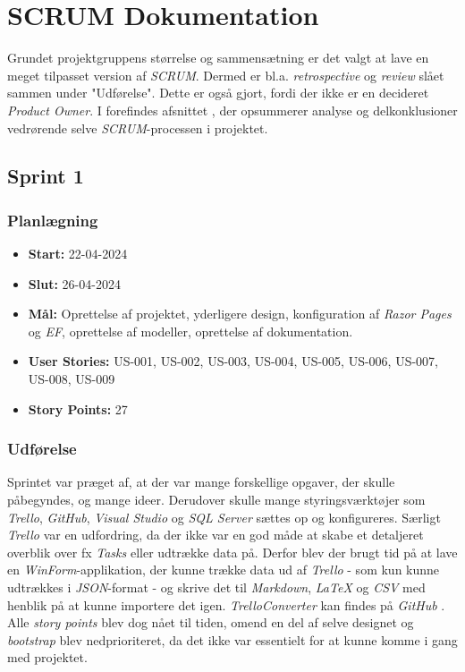 \chapter{SCRUM Dokumentation}
\label{chapter:scrum-documentation}
Grundet projektgruppens størrelse og sammensætning er det valgt at lave en meget tilpasset version af \emph{SCRUM}. Dermed er bl.a. \emph{retrospective} og \emph{review} slået sammen under "Udførelse". 
Dette er også gjort, fordi der ikke er en decideret \emph{Product Owner}. 
I  forefindes afsnittet , der opsummerer analyse og delkonklusioner vedrørende selve \emph{SCRUM}-processen i projektet.

\section{Sprint 1}
\label{sec:sprint-1}
\subsection{Planlægning}
\label{subsec:sprint-1-plan}
\begin{itemize}
    \item \textbf{Start:} 22-04-2024
    \item \textbf{Slut:} 26-04-2024
    \item \textbf{Mål:} Oprettelse af projektet, yderligere design, konfiguration af \emph{Razor Pages} og \emph{EF}, oprettelse af modeller, oprettelse af dokumentation.
    \item \textbf{User Stories:} US-001, US-002, US-003, US-004, US-005, US-006, US-007, US-008, US-009
    \item \textbf{Story Points:} 27
\end{itemize}

\subsection{Udførelse}
\label{subsec:sprint-1-udforelse}
Sprintet var præget af, at der var mange forskellige opgaver, der skulle påbegyndes, og mange ideer. 
Derudover skulle mange styringsværktøjer som \emph{Trello}, \emph{GitHub}, \emph{Visual Studio} og \emph{SQL Server} sættes op og konfigureres. 
Særligt \emph{Trello} var en udfordring, da der ikke var en god måde at skabe et detaljeret overblik over fx \emph{Tasks} eller udtrække data på. 
Derfor blev der brugt tid på at lave en \emph{WinForm}-applikation, der kunne trække data ud af \emph{Trello} - som kun kunne udtrækkes i \emph{JSON}-format - og skrive det til \emph{Markdown}, \emph{LaTeX} og \emph{CSV} med henblik på at kunne importere det igen. 
\emph{TrelloConverter} kan findes på \emph{GitHub} \cite{trello-converter}. 
Alle \emph{story points} blev dog nået til tiden, omend en del af selve designet og \emph{bootstrap} blev nedprioriteret, da det ikke var essentielt for at kunne komme i gang med projektet.

